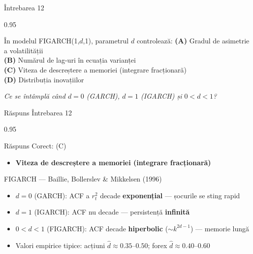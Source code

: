 \documentclass[9pt, aspectratio=169, t]{beamer}
\begin{document}
\begin{frame}{Întrebarea 12}
    \begin{cminipage}{0.95\textwidth}
    \begin{block}{În modelul FIGARCH(1,$d$,1), parametrul $d$ controlează:}
        \textcolor{MainBlue}{\textbf{(A)}} Gradul de asimetrie a volatilității\\[3pt]
        \textcolor{MainBlue}{\textbf{(B)}} Numărul de lag-uri în ecuația varianței\\[3pt]
        \textcolor{MainBlue}{\textbf{(C)}} Viteza de descreștere a memoriei (integrare fracționară)\\[3pt]
        \textcolor{MainBlue}{\textbf{(D)}} Distribuția inovațiilor
    \end{block}

    \vspace{0.5cm}

    \begin{center}
        \textit{Ce se întâmplă când $d = 0$ (GARCH), $d = 1$ (IGARCH) și $0 < d < 1$?}
    \end{center}
    \end{cminipage}
\end{frame}

\begin{frame}{Răspuns Întrebarea 12}
    \begin{cminipage}{0.95\textwidth}
    \begin{exampleblock}{Răspuns Corect: (C)}
        \begin{itemize}\setlength{\itemsep}{0pt}
            \item \textbf{Viteza de descreștere a memoriei (integrare fracționară)}
        \end{itemize}
    \end{exampleblock}

    \pause
    \begin{block}{FIGARCH --- Baillie, Bollerslev \& Mikkelsen (1996)}
        \begin{itemize}\setlength{\itemsep}{0pt}
            \item $d = 0$ (GARCH): ACF a $r_t^2$ decade \textbf{exponențial} --- șocurile se sting rapid
            \item $d = 1$ (IGARCH): ACF nu decade --- persistență \textbf{infinită}
            \item $0 < d < 1$ (FIGARCH): ACF decade \textbf{hiperbolic} ($\sim k^{2d-1}$) --- memorie lungă
            \item Valori empirice tipice: acțiuni $\hat{d} \approx 0.35$--$0.50$; forex $\hat{d} \approx 0.40$--$0.60$
        \end{itemize}
    \end{block}
    \end{cminipage}
\end{frame}
\end{document}
